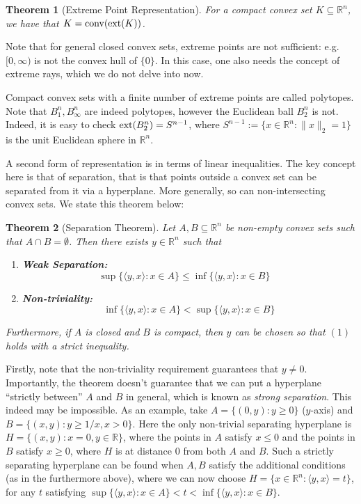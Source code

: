 \documentclass[11pt]{article}
\newtheorem{theorem}{Theorem}
\theoremstyle{plain}
\theoremstyle{plain}
\newcommand{\set}[1]{\{{#1}\}}
\newcommand{\R}{\ensuremath{\mathbb{R}}}
\newcommand{\pr}[2]{\langle{#1, #2}\rangle}
\begin{document}
\begin{theorem}[Extreme Point Representation] 
For a compact convex set $K \subseteq \R^n$, we have that 
$K = {\rm conv}({\rm ext}(K))$.
\label{thm:ext-pt-rep}
\end{theorem}

Note that for general closed convex sets, extreme points are not sufficient:
e.g. $[0,\infty)$ is not the convex hull of $\set{0}$. In this case, one also
needs the concept of extreme rays, which we do not delve into now.

Compact convex sets with a finite number of extreme points are called polytopes.
Note that $B_1^n, B_\infty^n$ are indeed polytopes, however the Euclidean ball
$B_2^n$ is not. Indeed, it is easy to check ${\rm ext}(B_2^n) = S^{n-1}$, where
$S^{n-1} := \set{x \in \R^n: \|x\|_2 = 1}$ is the unit Euclidean sphere in
$\R^n$.

A second form of representation is in terms of linear inequalities. The key
concept here is that of separation, that is that points outside a convex set can
be separated from it via a hyperplane. More generally, so can non-intersecting
convex sets. We state this theorem below: 

\begin{theorem}[Separation Theorem] Let $A,B \subseteq \R^n$ be non-empty convex
sets such that $A \cap B = \emptyset$. Then there exists $y \in \R^n$ such that
\begin{enumerate}
\item {\bf Weak Separation:}
\[
\sup \set{\pr{y}{x}: x \in A} \leq \inf \set{\pr{y}{x}: x \in B} \quad
\]
\item {\bf Non-triviality:}
\[
\inf \set{\pr{y}{x}: x \in A} < \sup \set{\pr{y}{x}: x \in B} 
\]
\end{enumerate}
Furthermore, if $A$ is closed and $B$ is compact, then $y$ can be chosen so that
$(1)$ holds with a strict inequality.
\label{thm:sep}
\end{theorem}

Firstly, note that the non-triviality requirement guarantees that $y \neq 0$.
Importantly, the theorem doesn't guarantee that we can put a hyperplane
``strictly between'' $A$ and $B$ in general, which is known as \emph{strong
separation}. This indeed may be impossible. As an example, take $A = \set{(0,y):
y \geq 0}$ ($y$-axis) and $B = \set{(x,y): y \geq 1/x, x > 0}$.  Here the only
non-trivial separating hyperplane is $H = \set{(x,y): x = 0, y \in \R}$, where
the points in $A$ satisfy $x \leq 0$ and the points in $B$ satisfy $x \geq 0$,
where $H$ is at distance $0$ from both $A$ and $B$. Such a strictly separating
hyperplane can be found when $A,B$ satisfy the additional conditions (as in the
furthermore above), where we can now choose $H = \set{x \in \R^n: \pr{y}{x} =
t}$, for any $t$ satisfying $\sup \set{\pr{y}{x}: x \in A} < t < \inf
\set{\pr{y}{x}: x \in B}$.  
\end{document}
